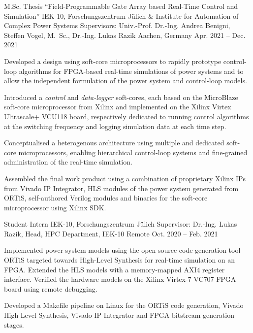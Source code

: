 
\begin{cvexperience}

\cvposition
	{M.Sc. Thesis ``Field-Programmable Gate Array based Real-Time Control and Simulation''} %
	{IEK-10, Forschungszentrum J\"ulich \& Institute for Automation of Complex Power Systems} %
	{Supervisors: Univ.-Prof. Dr.-Ing. Andrea Benigni, Steffen Vogel, M.\, Sc., Dr.-Ing. Lukas Razik} %
	{Aachen, Germany} %
	{Apr. 2021 -- Dec. 2021} %
	{\begin{cvitems}
		\item {Developed a design using soft-core microprocessors to rapidly prototype control-loop algorithms for FPGA-based real-time simulations of power systems and to allow the independent formulation of the power system and control-loop models.}
		\item {Introduced a \textit{control} and \textit{data-logger} soft-cores, each based on the MicroBlaze soft-core microprocessor from Xilinx and implemented on the Xilinx Virtex Ultrascale+ VCU118 board, respectively dedicated to running control algorithms at the switching frequency and logging simulation data at each time step.} 
		\item {Conceptualised a heterogenous architecture using multiple and dedicated soft-core microprocessors, enabling hierarchical control-loop systems and fine-grained administration of the real-time simulation.}
  		\item {Assembled the final work product using a combination of proprietary Xilinx IPs from Vivado IP Integrator, HLS modules of the power system generated from ORTiS, self-authored Verilog modules and binaries for the soft-core microprocessor using Xilinx SDK.}
	\end{cvitems}}

\cvposition
	{Student Intern} %
	{IEK-10, Forschungszentrum J\"ulich} %
	{Supervisor: Dr.-Ing. Lukas Razik, Head, HPC Department, IEK-10} %
	{Remote} %
	{Oct. 2020 -- Feb. 2021} %
	{\begin{cvitems}
		\item {Implemented power system models using the open-source code-generation tool ORTiS targeted towards High-Level Synthesis for real-time simulation on an FPGA. Extended the HLS models with a memory-mapped AXI4 register interface. Verified the hardware models on the Xilinx Virtex-7 VC707 FPGA board using remote debugging.}
  		\item {Developed a Makefile pipeline on Linux for the ORTiS code generation, Vivado High-Level Synthesis, Vivado IP Integrator and FPGA bitstream generation stages.}
	\end{cvitems}}


\end{cvexperience}
